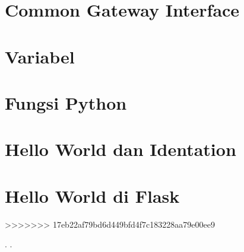 \documentclass{wileySix}
\begin{document}
\chapter[Instalasi PIP]
{Common Gateway Interface}


\chapter[Variabel]
{Variabel}



\chapter[Fungsi Python]
{Fungsi Python}


\chapter[Hello World Python dan Identation]
{Hello World dan Identation}


\chapter[Hello World di Flask]
{Hello World di Flask}




>>>>>>> 17eb22af79bd6d449bfd4f7c183228aa79e00ee9







.
.

\printindex
\end{document}

